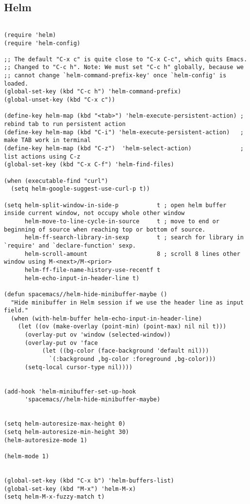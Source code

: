 \documentclass[11pt]{article}
\begin{document}
\subsection{Helm}
\label{sec:org0495569}
\begin{verbatim}

(require 'helm)
(require 'helm-config)

;; The default "C-x c" is quite close to "C-x C-c", which quits Emacs.
;; Changed to "C-c h". Note: We must set "C-c h" globally, because we
;; cannot change `helm-command-prefix-key' once `helm-config' is loaded.
(global-set-key (kbd "C-c h") 'helm-command-prefix)
(global-unset-key (kbd "C-x c"))

(define-key helm-map (kbd "<tab>") 'helm-execute-persistent-action) ; rebind tab to run persistent action
(define-key helm-map (kbd "C-i") 'helm-execute-persistent-action)   ; make TAB work in terminal
(define-key helm-map (kbd "C-z")  'helm-select-action)              ; list actions using C-z
(global-set-key (kbd "C-x C-f") 'helm-find-files)

(when (executable-find "curl")
  (setq helm-google-suggest-use-curl-p t))

(setq helm-split-window-in-side-p           t ; open helm buffer inside current window, not occupy whole other window
      helm-move-to-line-cycle-in-source     t ; move to end or beginning of source when reaching top or bottom of source.
      helm-ff-search-library-in-sexp        t ; search for library in `require' and `declare-function' sexp.
      helm-scroll-amount                    8 ; scroll 8 lines other window using M-<next>/M-<prior>
      helm-ff-file-name-history-use-recentf t
      helm-echo-input-in-header-line t)

(defun spacemacs//helm-hide-minibuffer-maybe ()
  "Hide minibuffer in Helm session if we use the header line as input field."
  (when (with-helm-buffer helm-echo-input-in-header-line)
    (let ((ov (make-overlay (point-min) (point-max) nil nil t)))
      (overlay-put ov 'window (selected-window))
      (overlay-put ov 'face
		   (let ((bg-color (face-background 'default nil)))
		     `(:background ,bg-color :foreground ,bg-color)))
      (setq-local cursor-type nil))))


(add-hook 'helm-minibuffer-set-up-hook
	  'spacemacs//helm-hide-minibuffer-maybe)


(setq helm-autoresize-max-height 0)
(setq helm-autoresize-min-height 30)
(helm-autoresize-mode 1)

(helm-mode 1)


(global-set-key (kbd "C-x b") 'helm-buffers-list)
(global-set-key (kbd "M-x") 'helm-M-x)
(setq helm-M-x-fuzzy-match t)


\end{verbatim}
\end{document}
